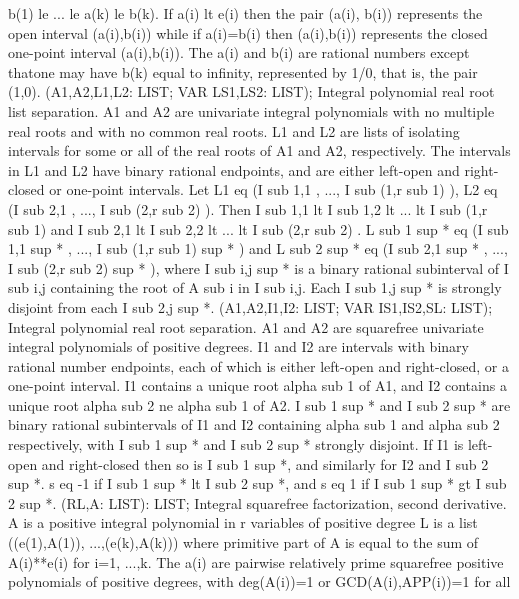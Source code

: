 b(1) le  ... le a(k) le b(k).  If a(i) lt e(i) then the pair
(a(i), b(i)) represents the open interval (a(i),b(i)) while if
a(i)=b(i) then (a(i),b(i)) represents the closed one-point
interval (a(i),b(i)).  The a(i) and b(i) are rational
numbers except thatone may have b(k) equal to infinity, represented
by 1/0, that is, the pair (1,0). \ecom 
{} (A1,A2,L1,L2: LIST; VAR LS1,LS2: LIST); \eproc
\bcom Integral polynomial real root list separation. A1 and A2 are
univariate integral polynomials with no multiple real roots and with
no common real roots.  L1 and L2 are lists of isolating intervals for
some or all of the real roots of A1 and A2, respectively.  The
intervals in L1 and L2 have binary rational endpoints, and are either
left-open and right-closed or one-point intervals. Let
L1 eq (I sub 1,1 , ..., I sub (1,r sub 1) ),
L2 eq (I sub 2,1 , ..., I sub (2,r sub 2) ).
Then I sub 1,1  lt  I sub 1,2  lt   ...  lt  I sub (1,r sub 1)
and  I sub 2,1  lt  I sub 2,2  lt   ...  lt  I sub (2,r sub 2) .
L sub 1 sup *  eq (I sub 1,1 sup * , ..., I sub (1,r sub 1) sup * )
and L sub 2 sup *  eq (I sub 2,1 sup * , ..., I sub (2,r sub 2) sup * ),
where I sub i,j sup * is a binary rational subinterval of
I sub i,j containing the root of A sub i in I sub i,j.
Each I sub 1,j sup * is strongly disjoint from each
I sub 2,j sup *. \ecom 
{} (A1,A2,I1,I2: LIST; VAR IS1,IS2,SL: LIST); \eproc
\bcom Integral polynomial real root separation. A1 and A2 are squarefree
univariate integral polynomials of positive degrees.  I1 and I2
are intervals with binary rational number endpoints, each of
which is either left-open and right-closed, or a one-point interval.
I1 contains a unique root alpha sub 1 of A1, and I2 contains a
unique root alpha sub 2 ne alpha sub 1 of A2.  I sub 1 sup *
and I sub 2 sup * are binary rational subintervals of I1 and I2
containing alpha sub 1 and alpha sub 2 respectively, with
I sub 1 sup * and I sub 2 sup * strongly disjoint.  If I1 is
left-open and right-closed then so is I sub 1 sup *, and
similarly for I2 and I sub 2 sup *.  s eq -1
if I sub 1 sup *  lt  I sub 2 sup *, and s eq 1
if I sub 1 sup * gt I sub 2 sup *. \ecom 
{} (RL,A: LIST): LIST; \eproc
\bcom Integral squarefree factorization, second derivative. A is a
positive integral polynomial in r variables of positive degree L is a
list ((e(1),A(1)), ...,(e(k),A(k))) where primitive part of A
is equal to the sum of A(i)**e(i) for i=1, ...,k.  The a(i) are
pairwise relatively prime squarefree positive polynomials of
positive degrees, with deg(A(i))=1 or GCD(A(i),APP(i))=1 for all
